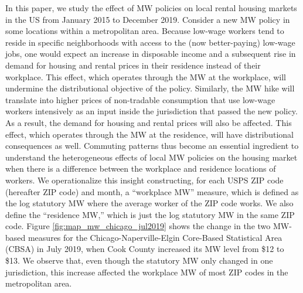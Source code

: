 In this paper, we study the effect of MW policies on local rental housing 
markets in the US from January 2015 to December 2019.
Consider a new MW policy in some locations within a metropolitan area.
Because low-wage workers tend to reside in specific neighborhoods with access 
to the (now better-paying) low-wage jobs,
one would expect an increase in disposable income and a subsequent rise in demand 
for housing and rental prices in their residence instead of their workplace.
This effect, which operates through the MW at the workplace, 
will undermine the distributional objective of the policy.
Similarly, the MW hike will translate into higher prices of non-tradable 
consumption that use low-wage workers intensively as an input inside the 
jurisdiction that passed the new policy.
As a result, the demand for housing and rental prices will also be affected.
This effect, which operates through the MW at the residence, will have 
distributional consequences as well.
Commuting patterns thus become an essential ingredient to understand the 
heterogeneous effects of local MW policies on the housing market when there 
is a difference between the workplace and residence locations of workers.
We operationalize this insight constructing, for each USPS ZIP code 
(hereafter ZIP code) and month,
a ``workplace MW'' measure, which is defined as the log statutory MW where
the average worker of the ZIP code works.
We also define the ``residence MW,'' which is just the log statutory MW in the
same ZIP code.
Figure \ref{fig:map_mw_chicago_jul2019} shows the change in the two MW-based 
measures for the Chicago-Naperville-Elgin Core-Based Statistical Area (CBSA) in 
July 2019, when Cook County increased its MW level from \$12 to \$13.
We observe that, even though the statutory MW only changed in one jurisdiction,
this increase affected the workplace MW of most ZIP codes in the metropolitan area.


